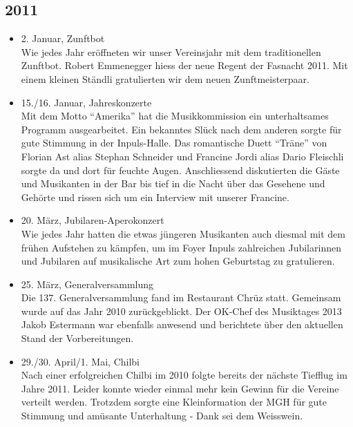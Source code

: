 \subsection{2011}
\begin{history}


    \begin{itemize}

        \item 2. Januar, Zunftbot\\
              Wie jedes Jahr eröffneten wir unser Vereinsjahr mit dem traditionellen
              Zunftbot. Robert Emmenegger hiess der neue Regent der Fasnacht 2011. Mit
              einem kleinen Ständli gratulierten wir dem neuen Zunftmeisterpaar.

        \item 15./16. Januar, Jahreskonzerte\\
              Mit dem Motto \enquote{Amerika} hat die Musikkommission ein unterhaltsames
              Programm ausgearbeitet. Ein bekanntes Slück nach dem anderen sorgte für
              gute Stimmung in der Inpuls-Halle. Das romantische Duett \enquote{Träne} von
              Florian Ast alias Stephan Schneider und Francine Jordi alias Dario
              Fleischli sorgte da und dort für feuchte Augen. Anschliessend
              diskutierten die Gäste und Musikanten in der Bar bis tief in die Nacht
              über das Gesehene und Gehörte und rissen sich um ein Interview mit
              unserer Francine.

        \item 20. März, Jubilaren-Aperokonzert\\
              Wie jedes Jahr hatten die etwas jüngeren Musikanten auch diesmal mit dem
              frühen Aufstehen zu kämpfen, um im Foyer Inpuls zahlreichen Jubilarinnen
              und Jubilaren auf musikalische Art zum hohen Geburtstag zu gratulieren.

        \item 25. März, Generalversammlung\\
              Die 137. Generalversammlung fand im Restaurant Chrüz statt. Gemeinsam
              wurde auf das Jahr 2010 zurückgeblickt. Der OK-Chef des Musiktages 2013
              Jakob Estermann war ebenfalls anwesend und berichtete über den aktuellen
              Stand der Vorbereitungen.

        \item 29./30. April/1. Mai, Chilbi\\
              Nach einer erfolgreichen Chilbi im 2010 folgte bereits der nächste
              Tiefflug im Jahre 2011. Leider konnte wieder einmal mehr kein Gewinn für
              die Vereine verteilt werden. Trotzdem sorgte eine Kleinformation der MGH
              für gute Stimmung und amüsante Unterhaltung - Dank sei dem Weisswein.


\end{itemize}
\end{history}
